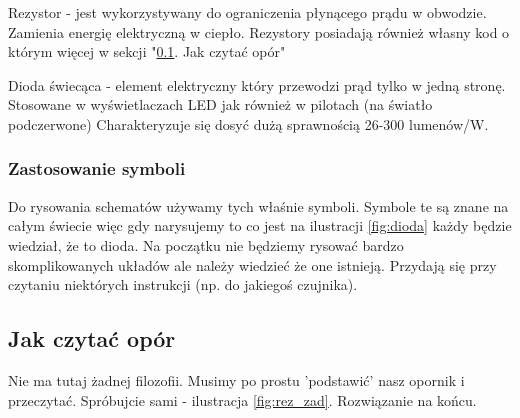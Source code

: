 \documentclass[a4paper,12pt, twoside]{article}
\begin{document}
Rezystor - jest wykorzystywany do ograniczenia płynącego prądu w obwodzie. Zamienia energię elektryczną w ciepło. Rezystory posiadają również własny kod o którym więcej w sekcji "\ref{subsec:kod}. Jak czytać opór" %

Dioda świecąca - element elektryczny który przewodzi prąd tylko w jedną stronę. Stosowane w wyświetlaczach LED jak również w pilotach (na światło podczerwone) Charakteryzuje się dosyć dużą sprawnością 26-300 lumenów/W. 

\subsubsection{Zastosowanie symboli}
    
Do rysowania schematów używamy tych właśnie symboli. Symbole te są znane na całym świecie więc gdy narysujemy to co jest na ilustracji \ref{fig:dioda} każdy będzie wiedział, że to dioda. Na początku nie będziemy rysować bardzo skomplikowanych układów ale należy wiedzieć że one istnieją. Przydają się przy czytaniu niektórych instrukcji (np. do jakiegoś czujnika).

	\subsection{Jak czytać opór}
	\label{subsec:kod}
Nie ma tutaj żadnej filozofii. Musimy po prostu 'podstawić' nasz opornik i przeczytać. Spróbujcie sami - ilustracja \ref{fig:rez_zad}. Rozwiązanie na końcu.
\end{document}
